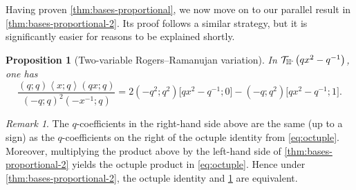 \documentclass[reqno,11pt]{amsart}
\newtheorem{proposition}[theorem]{Proposition}
\theoremstyle{definition}
\theoremstyle{remark}
\newtheorem*{remark}{Remark}
\numberwithin{equation}{section}
\newcommand{\C}{\mathbb{C}}
\newcommand{\Hminus}{{\mathbb{H}^{\textnormal{-}\hspace{-0.03cm}}}}
\newcommand{\mT}{\mathcal{T}}
\newcommand{\la}{\left\langle}
\newcommand{\ra}{\right\rangle}
\newcommand{\vect}[2]{\big[{#1};{#2}\big]}
\newcommand{\fix}[1]{\textcolor{blue}{\large (#1)\normalsize}}
\begin{document}
Having proven \cref{thm:bases-proportional}, we now move on to our parallel result in \cref{thm:bases-proportional-2}. Its proof follows a similar strategy, but it is significantly easier for reasons to be explained shortly.
\begin{proposition}[Two-variable Rogers--Ramanujan variation] \label{prop:2var-rog-ram-var}
In $\mT_\Hminus\left(qx^2 - q^{-1}\right)$, one has
\[
    \frac{(q; q)\la x; q\ra (qx; q)}{(-q; q)^2\left(- x^{-1}; q\right)}
    =
    2\left(-q^2; q^2\right) \vect{qx^2 - q^{-1}}{0}
    - \left(-q; q^2\right)\vect{qx^2 - q^{-1}}{1}.
\]
\end{proposition}
\begin{remark}
The $q$-coefficients in the right-hand side above are the same (up to a sign) as the $q$-coefficients on the right of the octuple identity from \cref{eq:octuple}. Moreover, multiplying the product above by the left-hand side of \cref{thm:bases-proportional-2} yields the octuple product in \cref{eq:octuple}. Hence under \cref{thm:bases-proportional-2}, the octuple identity and \cref{prop:2var-rog-ram-var} are equivalent.
\end{remark}
\end{document}
